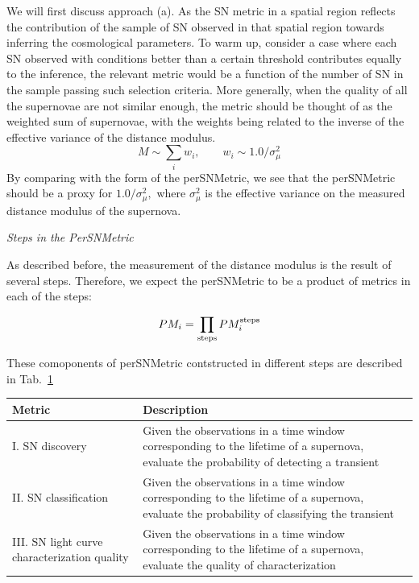 We will first discuss approach (a).
As the SN metric in a spatial region reflects the contribution of the sample
of SN observed in that spatial region towards inferring the cosmological
parameters. To warm up, consider a case where each SN observed with conditions better than a certain threshold contributes equally to the inference, the
relevant metric would be a function of the number of SN in the sample passing
such selection criteria. More generally, when the quality of all the supernovae are not similar enough, the metric should be thought of as the weighted sum of supernovae, with the weights being related to the inverse of the effective 
variance of the distance modulus.
\begin{equation}
M\sim \sum_i w_i , \qquad  w_i \sim 1.0 /\sigma^2_\mu
\end{equation}
By comparing with the form of the perSNMetric, we see that the perSNMetric
should be a proxy for $1.0/\sigma^2_\mu,$ where $\sigma^2_\mu$ is the effective variance on the measured distance modulus of the supernova.

{\it  Steps in the PerSNMetric}

As described before, the measurement of the distance modulus is the result of several steps. Therefore, we expect the perSNMetric to be a product of metrics in each of the steps:

\begin{equation}
PM_i = \prod_{\rm{steps}} PM_i^{\rm{steps}}
\end{equation}

These comoponents of perSNMetric contstructed in different steps are described in Tab.~\ref{tab:stepsAndMetrics}
\begin{center}
 \begin{table}
\begin{tabular}{| p{5cm} |p{10cm}| }
\hline Metric & Description \\
\hline
I. SN discovery  &  Given the observations in a time window corresponding to the lifetime of a supernova, evaluate the  probability of detecting a
transient \\
II. SN classification & Given the observations in a time window corresponding to the lifetime of a supernova, evaluate the probability of classifying the transient\\
III. SN light curve characterization quality & Given the observations in a time window corresponding to the lifetime of a supernova, evaluate the quality of characterization\\
\hline \end{tabular}
\label{tab:stepsAndMetrics}
\end{table}
\end{center}



